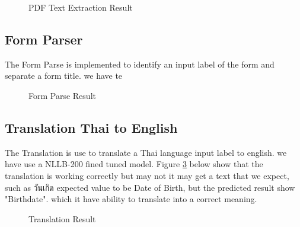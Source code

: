 \documentclass[12pt,oneside,openright,a4paper]{cpe-english-project}
\begin{document}
\begin{figure}[H]
\centering
{}
\caption{PDF Text Extraction Result}\label{fig:pdf-result}
\end{figure}

\subsection{Form Parser}
The Form Parse is implemented to identify an input label of the form and separate a form title. we have te

\begin{figure}[H]
\centering
{}
\caption{Form Parse Result}\label{fig:Form-Parse}
\end{figure}

\subsection{Translation Thai to English}
The Translation is use to translate a Thai language input label to english. we have use a NLLB-200 fined tuned model. Figure \ref{fig:trans-result} below show that the translation is working correctly but may not it may get a text that we expect, such as \textthai{วันเกิด} expected value to be Date of Birth, but the predicted result show "Birthdate". which it have ability to translate into a correct meaning.

\begin{figure}[H]
\centering
{}
\caption{Translation Result}\label{fig:trans-result}
\end{figure}
\end{document}
